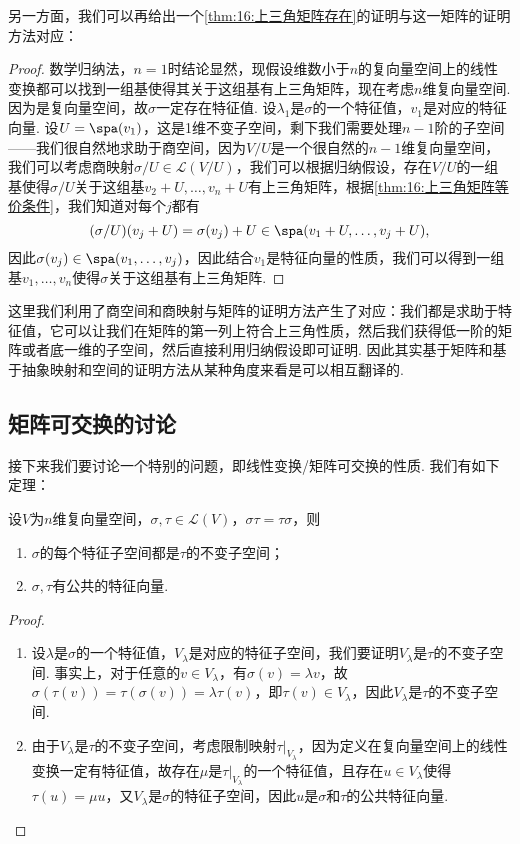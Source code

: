 另一方面，我们可以再给出一个\autoref{thm:16:上三角矩阵存在}的证明与这一矩阵的证明方法对应：
\begin{proof}
    数学归纳法，$n=1$时结论显然，现假设维数小于$n$的复向量空间上的线性变换都可以找到一组基使得其关于这组基有上三角矩阵，现在考虑$n$维复向量空间. 因为是复向量空间，故$\sigma$一定存在特征值. 设$\lambda_1$是$\sigma$的一个特征值，$v_1$是对应的特征向量. 设$U=\spa(v_1)$，这是1维不变子空间，剩下我们需要处理$n-1$阶的子空间——我们很自然地求助于商空间，因为$V/U$是一个很自然的$n-1$维复向量空间，我们可以考虑商映射$\sigma/U\in\mathcal{L}(V/U)$，我们可以根据归纳假设，存在$V/U$的一组基使得$\sigma/U$关于这组基$v_2+U,\ldots,v_n+U$有上三角矩阵，根据\autoref{thm:16:上三角矩阵等价条件}，我们知道对每个$j$都有
    \[(\sigma/U)(v_j+U)=\sigma(v_j)+U\in\spa(v_1+U,\ldots,v_j+U),\]
    因此$\sigma(v_j)\in\spa(v_1,\ldots,v_j)$，因此结合$v_1$是特征向量的性质，我们可以得到一组基$v_1,\ldots,v_n$使得$\sigma$关于这组基有上三角矩阵.
\end{proof}

这里我们利用了商空间和商映射与矩阵的证明方法产生了对应：我们都是求助于特征值，它可以让我们在矩阵的第一列上符合上三角性质，然后我们获得低一阶的矩阵或者底一维的子空间，然后直接利用归纳假设即可证明. 因此其实基于矩阵和基于抽象映射和空间的证明方法从某种角度来看是可以相互翻译的.

\subsection{矩阵可交换的讨论}
接下来我们要讨论一个特别的问题，即线性变换/矩阵可交换的性质. 我们有如下定理：
\begin{theorem} \label{ex:16:线性变换可交换}
    设$V$为$n$维复向量空间，$\sigma,\tau\in \mathcal{L}(V)$，$\sigma\tau=\tau\sigma$，则
    \begin{enumerate}
        \item $\sigma$的每个特征子空间都是$\tau$的不变子空间；

        \item $\sigma,\tau$有公共的特征向量.
    \end{enumerate}
\end{theorem}
\begin{proof}
    \begin{enumerate}
        \item 设$\lambda$是$\sigma$的一个特征值，$V_\lambda$是对应的特征子空间，我们要证明$V_\lambda$是$\tau$的不变子空间. 事实上，对于任意的$v\in V_\lambda$，有$\sigma(v)=\lambda v$，故$\sigma(\tau(v))=\tau(\sigma(v))=\lambda\tau(v)$，即$\tau(v)\in V_\lambda$，因此$V_\lambda$是$\tau$的不变子空间.

        \item 由于$V_\lambda$是$\tau$的不变子空间，考虑限制映射$\tau\vert_{V_\lambda}$，因为定义在复向量空间上的线性变换一定有特征值，故存在$\mu$是$\tau\vert_{V_\lambda}$的一个特征值，且存在$u\in V_\lambda$使得$\tau(u)=\mu u$，又$V_\lambda$是$\sigma$的特征子空间，因此$u$是$\sigma$和$\tau$的公共特征向量.
    \end{enumerate}
\end{proof}

